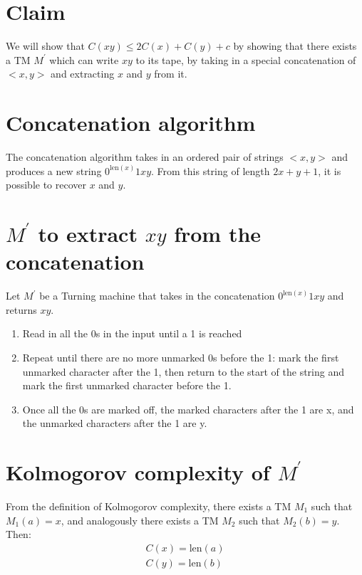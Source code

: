 \documentclass[11pt,addpoints,answers]{exam}
\newcommand{\1}{\mathbf{1}}
\begin{document}
\pagestyle{head}                %

\medskip
 
\section{Claim}

We will show that $C(xy) \leq 2 C(x) + C(y) + c$ by showing that there exists a TM $M^\prime$ which can write $xy$ to its tape, by taking in a special concatenation of $<x, y>$ and extracting $x$ and $y$ from it.

\section{Concatenation algorithm}

The concatenation algorithm takes in an ordered pair of strings $<x,y>$ and produces a new string $0^{\text{len}(x)}1xy$. From this string of length $2x + y + 1$, it is possible to recover $x$ and $y$.

\section{$M^\prime$ to extract $xy$ from the concatenation}

Let $M^\prime$ be a Turning machine that takes in the concatenation $0^{\text{len}(x)}1xy$ and returns $xy$.

\begin{enumerate}
    \item Read in all the 0s in the input until a 1 is reached
    \item Repeat until there are no more unmarked 0s before the 1: mark the first unmarked character after the 1, then return to the start of the string and mark the first unmarked character before the 1.
    \item Once all the 0s are marked off, the marked characters after the 1 are x, and the unmarked characters after the 1 are y.
\end{enumerate}

\section{Kolmogorov complexity of $M^\prime$}

From the definition of Kolmogorov complexity, there exists a TM $M_1$ such that $M_1(a) = x$, and analogously there exists a TM $M_2$ such that $M_2(b) = y$. Then:
\begin{align*}
    C(x) = \text{len}(a) \\
    C(y) = \text{len}(b)
\end{align*}
\end{document}
